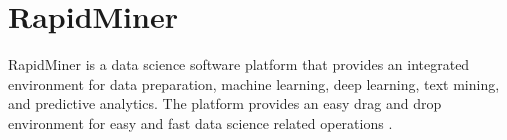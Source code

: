 \section{RapidMiner}

RapidMiner is a data science software platform that provides an integrated environment for data preparation, machine learning, deep learning, text mining, and predictive analytics. The platform provides an easy drag and drop environment for easy and fast data science related operations \cites{hid-sp18-511-rapidminer}.
